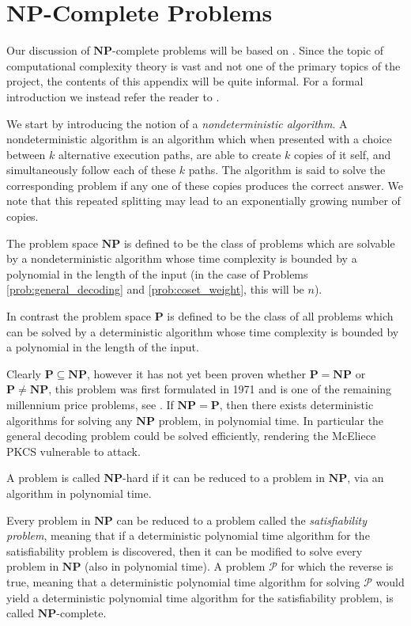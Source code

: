 \chapter{$\mathbf{NP}$-Complete Problems}\label{app:np_completeness}
Our discussion of $\mathbf{NP}$-complete problems will be based on \cite{general_decoding_problem_is_np}. Since the topic of computational complexity theory is vast and not one of the primary topics of the project, the contents of this appendix will be quite informal. For a formal introduction we instead refer the reader to \cite{complexity}.

We start by introducing the notion of a \textit{nondeterministic algorithm}. A nondeterministic algorithm is an algorithm which when presented with a choice between $k$ alternative execution paths, are able to create $k$ copies of it self, and simultaneously follow each of these $k$ paths. The algorithm is said to solve the corresponding problem if any one of these copies produces the correct answer. We note that this repeated splitting may lead to an exponentially growing number of copies.

The problem space $\mathbf{NP}$ is defined to be the class of problems which are solvable by a nondeterministic algorithm whose time complexity is bounded by a polynomial in the length of the input (in the case of Problems \ref{prob:general_decoding} and \ref{prob:coset_weight}, this will be $n$).

In contrast the problem space $\mathbf{P}$ is defined to be the class of all problems which can be solved by a deterministic algorithm whose time complexity is bounded by a polynomial in the length of the input.

Clearly $\mathbf{P} \subseteq \mathbf{NP}$, however it has not yet been proven whether $\mathbf{P} = \mathbf{NP}$ or $\mathbf{P} \neq \mathbf{NP}$, this problem was first formulated in 1971 and is one of the remaining millennium price problems, see \cite{milenium}. If $\mathbf{NP} = \mathbf{P}$, then there exists deterministic algorithms for solving any $\mathbf{NP}$ problem, in polynomial time. In particular the general decoding problem could be solved efficiently, rendering the McEliece PKCS vulnerable to attack.

A problem is called $\mathbf{NP}$-hard if it can be reduced to a problem in $\mathbf{NP}$, via an algorithm in polynomial time.

Every problem in $\mathbf{NP}$ can be reduced to a problem called the \textit{satisfiability problem}, meaning that if a deterministic polynomial time algorithm for the satisfiability problem is discovered, then it can be modified to solve every problem in $\mathbf{NP}$ (also in polynomial time). A problem $\mathcal{P}$ for which the reverse is true, meaning that a deterministic polynomial time algorithm for solving $\mathcal{P}$ would yield a deterministic polynomial time algorithm for the satisfiability problem, is called $\mathbf{NP}$-complete.

